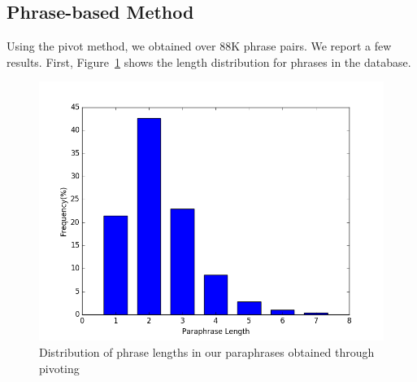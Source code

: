 \documentclass[11pt,letterpaper]{article}
\begin{document}
\subsection{Phrase-based Method}
Using the pivot method, we obtained over 88K phrase pairs. We report a few results. First, Figure~\ref{fig:para_length} shows the length distribution for phrases in the database.\\ 
\begin{figure}[h!]
\includegraphics[scale=0.4]{phrase_len}
\caption{Distribution of phrase lengths in our paraphrases obtained through pivoting}
\label{fig:para_length}
\end{figure}
\end{document}
